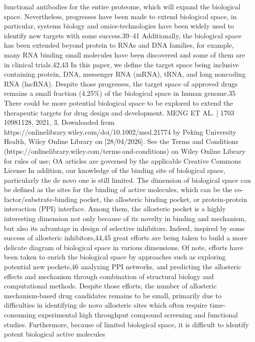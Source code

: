 functional antibodies for the entire proteome, which will expand the biological space. Nevertheless, progresses
have been made to extend biological space, in particular, systems biology and omics‐technologies have been widely
used to identify new targets with some success.39–41 Additionally, the biological space has been extended beyond
protein to RNAs and DNA families, for example, many RNA binding small molecules have been discovered and
some of them are in clinical trials.42,43 In this paper, we define the target space being inclusive containing protein,
DNA, messenger RNA (mRNA), tRNA, and long noncoding RNA (lncRNA). Despite those progresses, the target
space of approved drugs remains a small fraction (4.25\%) of the biological space in human genome.35 There could
be more potential biological space to be explored to extend the therapeutic targets for drug design and
development.
MENG ET AL.
| 1703
 10981128, 2021, 3, Downloaded from https://onlinelibrary.wiley.com/doi/10.1002/med.21774 by Peking University Health, Wiley Online Library on [28/04/2026]. See the Terms and Conditions (https://onlinelibrary.wiley.com/terms-and-conditions) on Wiley Online Library for rules of use; OA articles are governed by the applicable Creative Commons License
In addition, our knowledge of the binding site of biological space, particularly the de novo one is still limited.
The dimension of biological space can be defined as the sites for the binding of active molecules, which can be the
co‐factor/substrate‐binding pocket, the allosteric binding pocket, or protein‐protein interaction (PPI) interface.
Among them, the allosteric pocket is a highly interesting dimension not only because of its novelty in binding and
mechanism, but also its advantage in design of selective inhibitors. Indeed, inspired by some success of allosteric
inhibitors,44,45 great efforts are being taken to build a more delicate diagram of biological space in various
dimensions. Of note, efforts have been taken to enrich the biological space by approaches such as exploring
potential new pockets,46 analyzing PPI networks, and predicting the allosteric effects and mechanism through
combination of structural biology and computational methods. Despite those efforts, the number of allosteric
mechanism‐based drug candidates remains to be small, primarily due to difficulties in identifying de novo allosteric
sites which often require time‐consuming experimental high throughput compound screening and functional
studies.
Furthermore, because of limited biological space, it is difficult to identify potent biological active molecules
